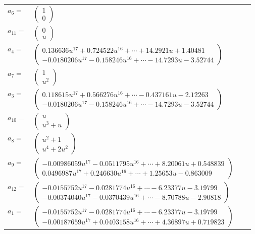 \documentclass[1p]{elsarticle_modified}
\theoremstyle{definition}
\begin{document}
\begin{tabular}{m{7pt} m{180pt} m{7pt} m{180pt} }
\flushright $a_{6}=$&$\begin{pmatrix}1\\0\end{pmatrix}$ \\
\flushright $a_{11}=$&$\begin{pmatrix}0\\u\end{pmatrix}$ \\
\flushright $a_{4}=$&$\begin{pmatrix}0.136636 u^{17}+0.724522 u^{16}+\cdots+14.2921 u+1.40481\\-0.0180206 u^{17}-0.158246 u^{16}+\cdots-14.7293 u-3.52744\end{pmatrix}$ \\
\flushright $a_{7}=$&$\begin{pmatrix}1\\u^2\end{pmatrix}$ \\
\flushright $a_{3}=$&$\begin{pmatrix}0.118615 u^{17}+0.566276 u^{16}+\cdots-0.437161 u-2.12263\\-0.0180206 u^{17}-0.158246 u^{16}+\cdots-14.7293 u-3.52744\end{pmatrix}$ \\
\flushright $a_{10}=$&$\begin{pmatrix}u\\u^3+u\end{pmatrix}$ \\
\flushright $a_{8}=$&$\begin{pmatrix}u^2+1\\u^4+2 u^2\end{pmatrix}$ \\
\flushright $a_{9}=$&$\begin{pmatrix}-0.00986059 u^{17}-0.0511795 u^{16}+\cdots+8.20061 u+0.548839\\0.0496987 u^{17}+0.246630 u^{16}+\cdots+1.25653 u-0.863009\end{pmatrix}$ \\
\flushright $a_{12}=$&$\begin{pmatrix}-0.0155752 u^{17}-0.0281774 u^{16}+\cdots-6.23377 u-3.19799\\-0.00374040 u^{17}-0.0370439 u^{16}+\cdots-8.70788 u-2.90818\end{pmatrix}$ \\
\flushright $a_{1}=$&$\begin{pmatrix}-0.0155752 u^{17}-0.0281774 u^{16}+\cdots-6.23377 u-3.19799\\-0.00187659 u^{17}+0.0403158 u^{16}+\cdots+4.36897 u+0.719823\end{pmatrix}$ \\

\end{tabular}
\end{document}
